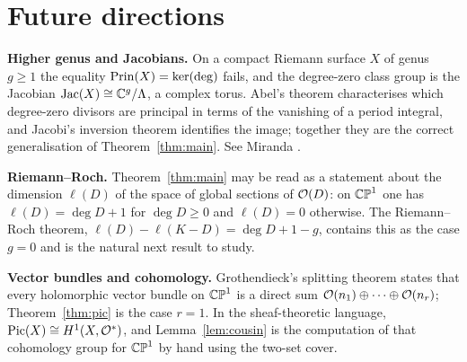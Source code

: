 \section{Future directions}\label{sec:future}

\textbf{Higher genus and Jacobians.} On a compact Riemann surface $X$ of genus
$g \geq 1$ the equality $\operatorname{Prin}(X) = \ker(\deg)$ fails, and the degree-zero class
group is the Jacobian $\operatorname{Jac}(X) \cong \mathbb{C}^g/\Lambda$, a complex
torus. Abel's theorem characterises which degree-zero divisors are principal in
terms of the vanishing of a period integral, and Jacobi's inversion theorem
identifies the image; together they are the correct generalisation of
Theorem~\ref{thm:main}. See Miranda \cite[Ch.~VIII]{Miranda}.

\textbf{Riemann--Roch.} Theorem~\ref{thm:main} may be read as a statement about
the dimension $\ell(D)$ of the space of global sections of $\mathcal{O}(D)$: on $\mathbb{CP}^1$
one has $\ell(D) = \deg D + 1$ for $\deg D \geq 0$ and $\ell(D) = 0$ otherwise.
The Riemann--Roch theorem, $\ell(D) - \ell(K-D) = \deg D + 1 - g$, contains this
as the case $g = 0$ and is the natural next result to study.

\textbf{Vector bundles and cohomology.} Grothendieck's splitting theorem states
that every holomorphic vector bundle on $\mathbb{CP}^1$ is a direct sum
$\mathcal{O}(n_1)\oplus\cdots\oplus\mathcal{O}(n_r)$; Theorem~\ref{thm:pic} is the case
$r = 1$. In the sheaf-theoretic language, $\operatorname{Pic}(X) \cong H^1(X, \mathcal{O}^\ast)$, and
Lemma~\ref{lem:cousin} is the computation of that cohomology group for $\mathbb{CP}^1$ by
hand using the two-set cover.

{}
